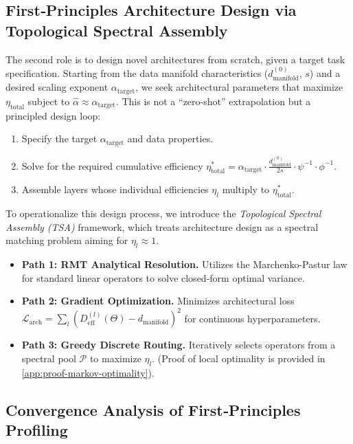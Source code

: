 \documentclass[11pt, a4paper]{article}
\theoremstyle{definition}
\begin{document}
\subsection{First‑Principles Architecture Design via Topological Spectral Assembly}
\label{subsec:first-principles-design}
The second role is to design novel architectures from scratch, given a target task specification. Starting from the data manifold characteristics ($d_{\text{manifold}}^{(0)}$, $s$) and a desired scaling exponent $\alpha_{\text{target}}$, we seek architectural parameters that maximize $\eta_{\text{total}}$ subject to $\hat{\alpha} \approx \alpha_{\text{target}}$. This is not a ``zero‑shot'' extrapolation but a principled design loop:
\begin{enumerate}
    \item Specify the target $\alpha_{\text{target}}$ and data properties.
    \item Solve for the required cumulative efficiency $\eta_{\text{total}}^* = \alpha_{\text{target}} \cdot \frac{d_{\text{manifold}}^{(0)}}{2s} \cdot \psi^{-1} \cdot \phi^{-1}$.
    \item Assemble layers whose individual efficiencies $\eta_l$ multiply to $\eta_{\text{total}}^*$.
\end{enumerate}
To operationalize this design process, we introduce the \emph{Topological Spectral Assembly (TSA)} framework, which treats architecture design as a spectral matching problem aiming for $\eta_l \approx 1$.
\begin{itemize}
    \item \textbf{Path 1: RMT Analytical Resolution.} Utilizes the Marchenko-Pastur law for standard linear operators to solve closed-form optimal variance.
    \item \textbf{Path 2: Gradient Optimization.} Minimizes architectural loss $\mathcal{L}_{\text{arch}} = \sum_l (D_{\text{eff}}^{(l)}(\Theta) - d_{\text{manifold}})^2$ for continuous hyperparameters.
    \item \textbf{Path 3: Greedy Discrete Routing.} Iteratively selects operators from a spectral pool $\mathcal{P}$ to maximize $\eta_l$. (Proof of local optimality is provided in \cref{app:proof-markov-optimality}).
\end{itemize}

\subsection{Convergence Analysis of First‑Principles Profiling}
\end{document}
